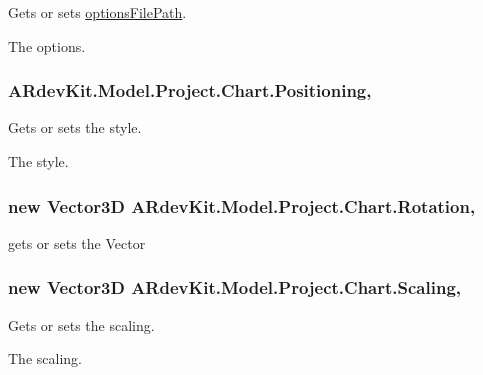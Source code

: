 Gets or sets \hyperlink{class_a_rdev_kit_1_1_model_1_1_project_1_1_chart_aaf91a6b3628dd8bc5e1717c1fada4f49}{options\-File\-Path}. 

The options. \hypertarget{class_a_rdev_kit_1_1_model_1_1_project_1_1_chart_ab0188f5581ff70bd3c70e5490646f26a}{
\subsubsection[{Positioning}]{ A\-Rdev\-Kit.\-Model.\-Project.\-Chart.\-Positioning\hspace{0.3cm}{\ttfamily [get]}, {\ttfamily [set]}}}\label{class_a_rdev_kit_1_1_model_1_1_project_1_1_chart_ab0188f5581ff70bd3c70e5490646f26a}


Gets or sets the style. 

The style. \hypertarget{class_a_rdev_kit_1_1_model_1_1_project_1_1_chart_ad65da47b510958a72b05f6e796307508}{
\subsubsection[{Rotation}]{\setlength{\rightskip}{0pt plus 5cm}new {\bf Vector3\-D} A\-Rdev\-Kit.\-Model.\-Project.\-Chart.\-Rotation\hspace{0.3cm}{\ttfamily [get]}, {\ttfamily [set]}}}\label{class_a_rdev_kit_1_1_model_1_1_project_1_1_chart_ad65da47b510958a72b05f6e796307508}


gets or sets the Vector 

\hypertarget{class_a_rdev_kit_1_1_model_1_1_project_1_1_chart_a29acf84a78af7e2d3a671b39dc823252}{
\subsubsection[{Scaling}]{\setlength{\rightskip}{0pt plus 5cm}new {\bf Vector3\-D} A\-Rdev\-Kit.\-Model.\-Project.\-Chart.\-Scaling\hspace{0.3cm}{\ttfamily [get]}, {\ttfamily [set]}}}\label{class_a_rdev_kit_1_1_model_1_1_project_1_1_chart_a29acf84a78af7e2d3a671b39dc823252}


Gets or sets the scaling. 

The scaling. 